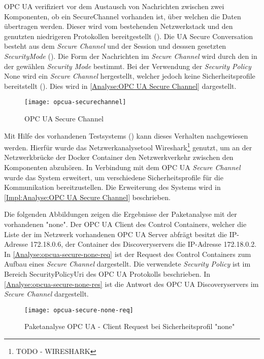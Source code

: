 \ac{OPC UA} verifiziert vor dem Austausch von Nachrichten zwischen zwei Komponenten, ob ein SecureChannel vorhanden ist, über welchen die Daten übertragen werden. Dieser wird vom bestehenden Netzwerkstack und den genutzten niedrigeren Protokollen bereitgestellt (\cite{opcpt1}). Die \ac{UA} Secure Conversation besteht aus dem \textit{Secure Channel} und der Session und desssen gesetzten \textit{SecurityMode} (\cite{opcpt2}). Die Form der Nachrichten im \textit{Secure Channel} wird durch den in der gewählen \textit{Security Mode} bestimmt. Bei der Verwendung der \textit{Security Policy} None wird ein \textit{Secure Channel} hergestellt, welcher jedoch keine Sicherheitsprofile bereitstellt (\cite{opcpt7}). Dies wird in \autoref{Analyse:OPC UA Secure Channel} dargestellt.

\begin{figure}[h]
  \centering
  \texttt{[image: opcua-securechannel]}
  \caption{OPC UA Secure Channel} 
  \label{Analyse:OPC UA Secure Channel}
\end{figure}

\clearpage

Mit Hilfe des vorhandenen Testsystems (\cite{Weber2018}) kann dieses Verhalten nachgewiesen werden. Hierfür wurde das Netzwerkanalysetool Wireshark\footnote{TODO - WIRESHARK} genutzt, um an der Netzwerkbrücke der Docker Container den Netzwerkverkehr zwischen den Komponenten abzuhören. In Verbindung mit dem \ac{OPC UA} \textit{Secure Channel} wurde das System erweitert, um verschiedene Sicherheitsprofile für die Kommunikation bereitzustellen. Die Erweiterung des Systems wird in \autoref{Impl:Analyse:OPC UA Secure Channel} beschrieben.

Die folgenden Abbildungen zeigen die Ergebnisse der Paketanalyse mit der vorhandenen  "none". Der \ac{OPC UA} Client des Control Containers, welcher die Liste der im Netzwerk vorhandenen \ac{OPC UA} Server abfrägt besitzt die \ac{IP}-Adresse 172.18.0.6, der Container des Discoveryservers die \ac{IP}-Adresse 172.18.0.2. In \autoref{Analyse:opcua-secure-none-req} ist der Request des Control Containers zum Aufbau eines \textit{Secure Channel} dargestellt. Die verwendete \textit{Security Policy} ist im Bereich SecurityPolicyUri des \ac{OPC UA} Protokolls beschrieben. In \autoref{Analyse:opcua-secure-none-res} ist die Antwort des \ac{OPC UA} Discoveryservers im \textit{Secure Channel} dargestellt. 

\begin{figure}[h]
  \centering
  \texttt{[image: opcua-secure-none-req]}
  \caption{Paketanalyse OPC UA - Client Request bei Sicherheitsprofil "none"} 
  \label{Analyse:opcua-secure-none-req}
\end{figure}

